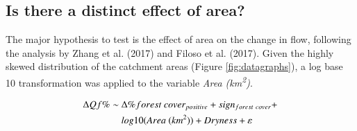 \documentclass[]{elsarticle} %
\begin{document}
\hypertarget{is-there-a-distinct-effect-of-area}{%
\subsection{Is there a distinct effect of area?}\label{is-there-a-distinct-effect-of-area}}

The major hypothesis to test is the effect of area on the change in flow, following the analysis by Zhang et al. (2017) and Filoso et al. (2017). Given the highly skewed distribution of the catchment areas (Figure \ref{fig:datagraphs}), a log base 10 transformation was applied to the variable \emph{Area (km\textsuperscript{2})}.

\begin{align}
\Delta Qf \% \sim ~ & \Delta \% forest~cover_{positive} + sign_{forest~cover} + \notag \\ & log10(Area ~(km^2)) + Dryness + \varepsilon \label{eq:eq6}
\end{align}
\end{document}
